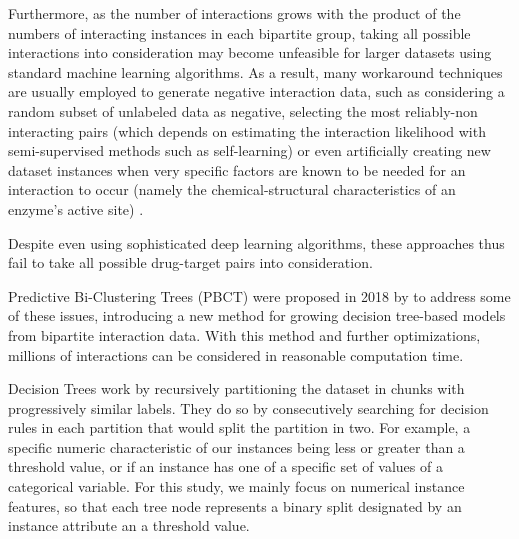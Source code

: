 \documentclass[conference]{IEEEtran}
\begin{document}
Furthermore, as the number of interactions grows with the product of the numbers
of interacting instances in each bipartite group, taking all possible
interactions into consideration may become unfeasible for larger datasets using
standard machine learning algorithms. As a result, many workaround techniques
are usually employed to generate negative interaction data, such as considering
a random subset of unlabeled data as negative\cite{Zhang_2018, Zitnik_2018,
Huang_2021}, selecting the most reliably-non interacting pairs (which depends on
estimating the interaction likelihood with semi-supervised methods such as
self-learning)\cite{} or even artificially creating new dataset instances when
very specific factors are known to be needed for an interaction to occur (namely
the chemical-structural characteristics of an enzyme's active site) \cite{}.

Despite even using sophisticated deep learning algorithms, these approaches thus
fail to take all possible drug-target pairs into consideration.

Predictive Bi-Clustering Trees (PBCT) were proposed in 2018 by
\cite{Pliakos_2018} to address some of these issues, introducing a new method
for growing decision tree-based models from bipartite interaction data. With
this method and further optimizations, millions of interactions can be
considered in reasonable computation time.

Decision Trees work by recursively partitioning the dataset in chunks with
progressively similar labels\cite{Breiman_1984, Quinlan_1996}. They do so by
consecutively searching for decision rules in each partition that would split
the partition in two. For example, a specific numeric characteristic of our
instances being less or greater than a threshold value, or if an instance has
one of a specific set of values of a categorical variable. For this study, we
mainly focus on numerical instance features, so that each tree node represents a
binary split designated by an instance attribute an a threshold value.
\end{document}
